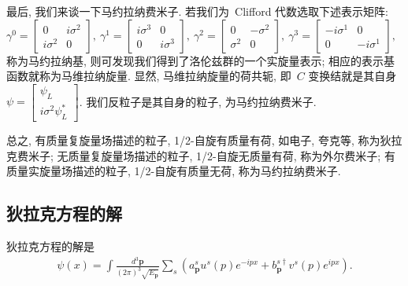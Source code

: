 最后, 我们来谈一下马约拉纳费米子. %
若我们为~Clifford 代数选取下述表示矩阵: $\gamma^0=
\left[\begin{array}{cc}
0&i\sigma^2\\
i\sigma^2&0
\end{array}\right],~
\gamma^1=
\left[\begin{array}{cc}
i\sigma^3&0\\
0&i\sigma^3
\end{array}\right],~
\gamma^2=
\left[\begin{array}{cc}
0&-\sigma^2\\
\sigma^2&0
\end{array}\right],~
\gamma^3=
\left[\begin{array}{cc}
-i\sigma^1&0\\
0&-i\sigma^1
\end{array}\right],$
称为马约拉纳基, 则可发现我们得到了洛伦兹群的一个实旋量表示; 相应的表示基函数就称为马维拉纳旋量. 显然, 马维拉纳旋量的荷共轭, 即~$C$ 变换结就是其自身~$\psi=\left[\begin{array}{c}\psi_L\\i\sigma^2\psi^*_L\end{array}\right]$. 我们反粒子是其自身的粒子, 为马约拉纳费米子.

总之, 有质量复旋量场描述的粒子, 1/2-自旋有质量有荷, 如电子, 夸克等, 称为狄拉克费米子; 无质量复旋量场描述的粒子, 1/2-自旋无质量有荷, 称为外尔费米子; 有质量实旋量场描述的粒子, 1/2-自旋有质量无荷, 称为马约拉纳费米子.









\subsection{狄拉克方程的解}



狄拉克方程的解是
\begin{align}
\psi(x)=\int\frac{d^3\bm{p}}{(2\pi)^3\sqrt{E_{\bm{p}}}}\sum_s\left(a^s_{\bm{p}}u^s(p)e^{-ipx}+b^{s\dag}_{\bm{p}}v^s(p)e^{ipx}\right).
\end{align}

















